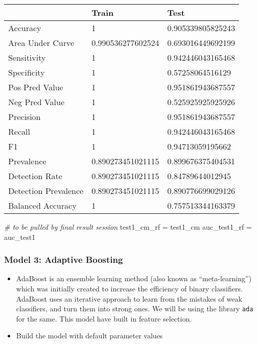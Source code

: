\documentclass[
]{article}
\newenvironment{Shaded}{\begin{snugshade}}{\end{snugshade}}
\newcommand{\CommentTok}[1]{\textcolor[rgb]{0.56,0.35,0.01}{\textit{#1}}}
\newcommand{\NormalTok}[1]{#1}
\newcommand{\StringTok}[1]{\textcolor[rgb]{0.31,0.60,0.02}{#1}}
\begin{document}
\begin{table}[H]
\centering
\begin{tabular}{l|l|l}
\hline
  & Train & Test\\
\hline
Accuracy & 1 & 0.905339805825243\\
\hline
Area Under Curve & 0.990536277602524 & 0.693016449692199\\
\hline
Sensitivity & 1 & 0.942446043165468\\
\hline
Specificity & 1 & 0.57258064516129\\
\hline
Pos Pred Value & 1 & 0.951861943687557\\
\hline
Neg Pred Value & 1 & 0.525925925925926\\
\hline
Precision & 1 & 0.951861943687557\\
\hline
Recall & 1 & 0.942446043165468\\
\hline
F1 & 1 & 0.94713059195662\\
\hline
Prevalence & 0.890273451021115 & 0.899676375404531\\
\hline
Detection Rate & 0.890273451021115 & 0.84789644012945\\
\hline
Detection Prevalence & 0.890273451021115 & 0.890776699029126\\
\hline
Balanced Accuracy & 1 & 0.757513344163379\\
\hline
\end{tabular}
\end{table}

\begin{Shaded}
\begin{Highlighting}[]
\CommentTok{# to be pulled by final result session}
\NormalTok{test1_cm_rf =}\StringTok{ }\NormalTok{test1_cm}
\NormalTok{auc_test1_rf =}\StringTok{ }\NormalTok{auc_test1}
\end{Highlighting}
\end{Shaded}

\hypertarget{model-3-adaptive-boosting}{%
\subsubsection{Model 3: Adaptive
Boosting}\label{model-3-adaptive-boosting}}

\begin{itemize}
\item
  AdaBoost is an ensemble learning method (also known as
  ``meta-learning'') which was initially created to increase the
  efficiency of binary classifiers. AdaBoost uses an iterative approach
  to learn from the mistakes of weak classifiers, and turn them into
  strong ones. We will be using the library \texttt{ada} for the same.
  This model have built in feature selection.
\item
  Build the model with default parameter values
\end{itemize}
\end{document}
